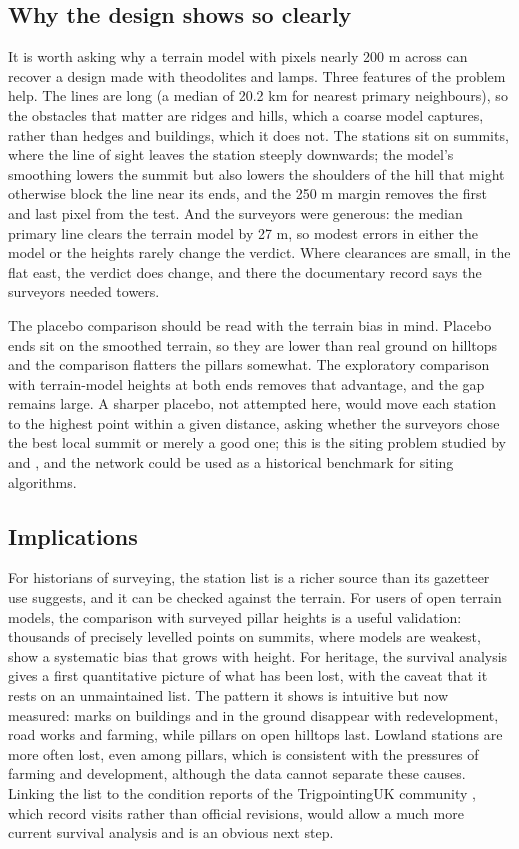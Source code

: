 \documentclass[11pt,a4paper]{article}
\begin{document}
\subsection{Why the design shows so clearly}
It is worth asking why a terrain model with pixels nearly 200 m across can recover a design made with theodolites and lamps. Three features of the problem help. The lines are long (a median of 20.2 km for nearest primary neighbours), so the obstacles that matter are ridges and hills, which a coarse model captures, rather than hedges and buildings, which it does not. The stations sit on summits, where the line of sight leaves the station steeply downwards; the model's smoothing lowers the summit but also lowers the shoulders of the hill that might otherwise block the line near its ends, and the 250 m margin removes the first and last pixel from the test. And the surveyors were generous: the median primary line clears the terrain model by 27 m, so modest errors in either the model or the heights rarely change the verdict. Where clearances are small, in the flat east, the verdict does change, and there the documentary record says the surveyors needed towers.

The placebo comparison should be read with the terrain bias in mind. Placebo ends sit on the smoothed terrain, so they are lower than real ground on hilltops and the comparison flatters the pillars somewhat. The exploratory comparison with terrain-model heights at both ends removes that advantage, and the gap remains large. A sharper placebo, not attempted here, would move each station to the highest point within a given distance, asking whether the surveyors chose the best local summit or merely a good one; this is the siting problem studied by \citet{lee1991} and \citet{kim2004}, and the network could be used as a historical benchmark for siting algorithms.

\subsection{Implications}
For historians of surveying, the station list is a richer source than its gazetteer use suggests, and it can be checked against the terrain. For users of open terrain models, the comparison with surveyed pillar heights is a useful validation: thousands of precisely levelled points on summits, where models are weakest, show a systematic bias that grows with height. For heritage, the survival analysis gives a first quantitative picture of what has been lost, with the caveat that it rests on an unmaintained list. The pattern it shows is intuitive but now measured: marks on buildings and in the ground disappear with redevelopment, road works and farming, while pillars on open hilltops last. Lowland stations are more often lost, even among pillars, which is consistent with the pressures of farming and development, although the data cannot separate these causes. Linking the list to the condition reports of the TrigpointingUK community \citep{tukpillar}, which record visits rather than official revisions, would allow a much more current survival analysis and is an obvious next step.
\end{document}
